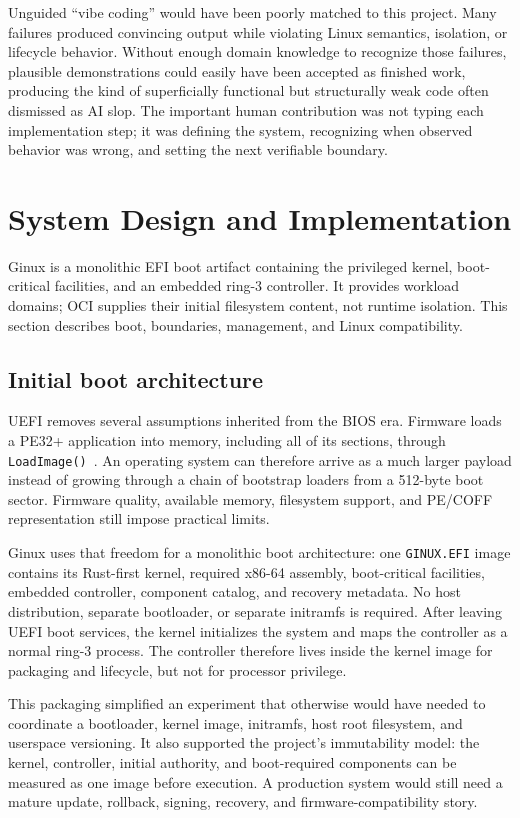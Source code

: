 \documentclass[11pt]{article}
\begin{document}
Unguided ``vibe coding'' would have been poorly matched to this project. Many
failures produced convincing output while violating Linux semantics, isolation,
or lifecycle behavior. Without enough domain knowledge to recognize those
failures, plausible demonstrations could easily have been accepted as finished
work, producing the kind of superficially functional but structurally weak code
often dismissed as AI slop. The important human contribution was not typing
each implementation step; it was defining the system, recognizing when observed
behavior was wrong, and setting the next verifiable boundary.

\section{System Design and Implementation}

Ginux is a monolithic EFI boot artifact containing the privileged kernel,
boot-critical facilities, and an embedded ring-3 controller. It provides
workload domains; OCI supplies their initial filesystem content, not runtime
isolation. This section describes boot, boundaries, management, and Linux
compatibility.

\subsection{Initial boot architecture}

UEFI removes several assumptions inherited from the BIOS era. Firmware loads a
PE32+ application into memory, including all of its sections, through
\texttt{LoadImage()}~\cite{uefi211}. An operating system can therefore arrive
as a much larger payload instead of growing through a chain of bootstrap
loaders from a 512-byte boot sector. Firmware quality, available memory,
filesystem support, and PE/COFF representation still impose practical limits.

Ginux uses that freedom for a monolithic boot architecture: one
\texttt{GINUX.EFI} image contains its Rust-first kernel, required x86-64
assembly, boot-critical facilities, embedded controller, component catalog,
and recovery metadata. No host distribution, separate bootloader, or separate
initramfs is required. After leaving UEFI boot services, the kernel initializes
the system and maps the controller as a normal ring-3 process. The controller
therefore lives inside the kernel image for packaging and lifecycle, but not
for processor privilege.

This packaging simplified an experiment that otherwise would have needed to
coordinate a bootloader, kernel image, initramfs, host root filesystem, and
userspace versioning. It also supported the project's immutability model: the
kernel, controller, initial authority, and boot-required components can be
measured as one image before execution. A production system would still
need a mature update, rollback, signing, recovery, and firmware-compatibility
story.
\end{document}
